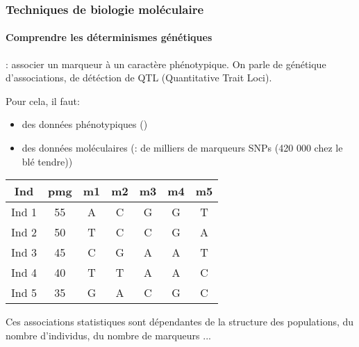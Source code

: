 \begin{frame}
\frametitle{Techniques de biologie moléculaire}
\framesubtitle{Comprendre les déterminismes génétiques}

: associer un marqueur à un caractère phénotypique. 
On parle de génétique d'associations, de détéction de QTL (Quantitative Trait Loci). 

Pour cela, il faut:
\begin{itemize}
\item des données phénotypiques ()
\item des données moléculaires (:  de milliers de marqueurs SNPs (420 000 chez le blé tendre))
\end{itemize}

\vspace{.5cm}

\begin{overprint}
\begin{center}
\begin{tabular}{ccccccc}
\hline
Ind & pmg & m1 & m2 & m3 & m4 & m5\\
\hline
Ind 1 & 55 & \cellcolor{mln-green} A & C & \cellcolor{mln-green} G & G & T \\
Ind 2 & 50 & T & C & C & G & A \\
Ind 3 & 45 & C & G & A & A & T \\
Ind 4 & 40 & T & T & A & A & C \\
Ind 5 & 35 & G & A & C & G & C \\
\hline
\end{tabular}
\end{center}

Ces associations statistiques sont dépendantes de la structure des populations, du nombre d'individus, du nombre de marqueurs ...
\end{overprint}



\end{frame}


